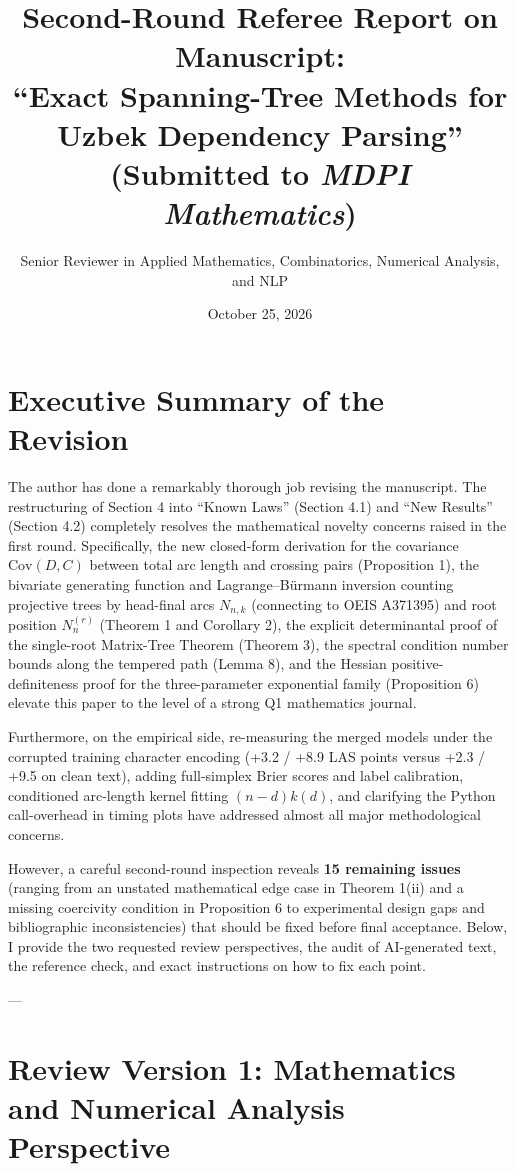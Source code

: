 \documentclass[11pt,a4paper]{article}
\title{\textbf{Second-Round Referee Report on Manuscript:}\\ ``Exact Spanning-Tree Methods for Uzbek Dependency Parsing''\\ (Submitted to \textit{MDPI Mathematics})}
\author{Senior Reviewer in Applied Mathematics, Combinatorics, Numerical Analysis, and NLP}
\date{October 25, 2026}
\begin{document}
\maketitle

\section*{Executive Summary of the Revision}
The author has done a remarkably thorough job revising the manuscript. The restructuring of Section 4 into ``Known Laws'' (Section 4.1) and ``New Results'' (Section 4.2) completely resolves the mathematical novelty concerns raised in the first round. Specifically, the new closed-form derivation for the covariance $\mathrm{Cov}(D, C)$ between total arc length and crossing pairs (Proposition 1), the bivariate generating function and Lagrange--B\"urmann inversion counting projective trees by head-final arcs $N_{n,k}$ (connecting to OEIS A371395) and root position $N_n^{(r)}$ (Theorem 1 and Corollary 2), the explicit determinantal proof of the single-root Matrix-Tree Theorem (Theorem 3), the spectral condition number bounds along the tempered path (Lemma 8), and the Hessian positive-definiteness proof for the three-parameter exponential family (Proposition 6) elevate this paper to the level of a strong Q1 mathematics journal. 

Furthermore, on the empirical side, re-measuring the merged models under the corrupted training character encoding (+3.2 / +8.9 LAS points versus +2.3 / +9.5 on clean text), adding full-simplex Brier scores and label calibration, conditioned arc-length kernel fitting $(n-d)k(d)$, and clarifying the Python call-overhead in timing plots have addressed almost all major methodological concerns.

However, a careful second-round inspection reveals \textbf{15 remaining issues} (ranging from an unstated mathematical edge case in Theorem 1(ii) and a missing coercivity condition in Proposition 6 to experimental design gaps and bibliographic inconsistencies) that should be fixed before final acceptance. Below, I provide the two requested review perspectives, the audit of AI-generated text, the reference check, and exact instructions on how to fix each point.

---

\section{Review Version 1: Mathematics and Numerical Analysis Perspective}
\end{document}
